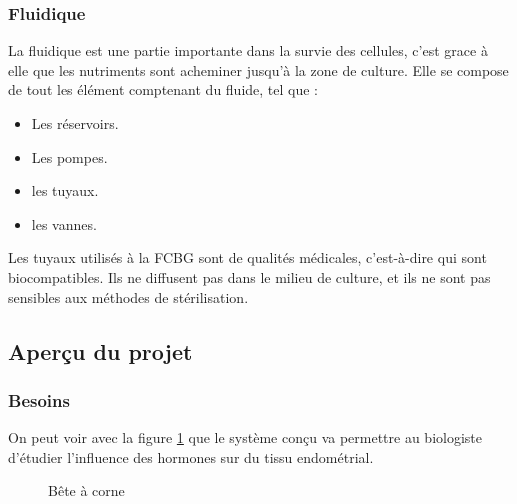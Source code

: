 \documentclass[a4paper, 11pt]{article}
\begin{document}
\subsubsection{Fluidique}
La fluidique est une partie importante dans la survie des cellules, c'est grace à elle que les
nutriments sont acheminer jusqu'à la zone de culture.
Elle se compose de tout les élément comptenant du fluide, tel que :
\begin{itemize}
    \item Les réservoirs.
    \item Les pompes.
    \item les tuyaux. 
    \item les vannes.
\end{itemize}
Les tuyaux utilisés à la FCBG sont de qualités médicales, c'est-à-dire qui sont biocompatibles. Ils ne diffusent pas
dans le milieu de culture, et ils ne sont pas sensibles aux méthodes de stérilisation.
\newpage
\subsection{Aperçu du projet}
\subsubsection{Besoins}
On peut voir avec la figure \ref{fig:bete_corne} que le système conçu va permettre au biologiste d'étudier l'influence des hormones sur du tissu endométrial.
\begin{figure}[H]
    \centering
    \caption{Bête à corne}
    \label{fig:bete_corne}
\end{figure}
\end{document}
